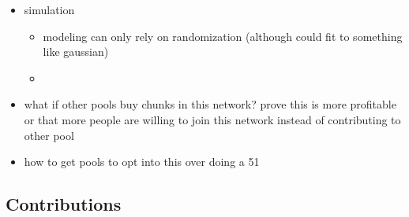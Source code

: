 \begin{itemize}
  \item simulation
    \begin{itemize}
      \item modeling can only rely on randomization (although could fit to something like gaussian)
      \item
    \end{itemize}
  \item what if other pools buy chunks in this network? prove this is more profitable or that more people are willing to join this network instead of contributing to other pool
  \item how to get pools to opt into this over doing a 51%
\end{itemize}

\subsection{Contributions}